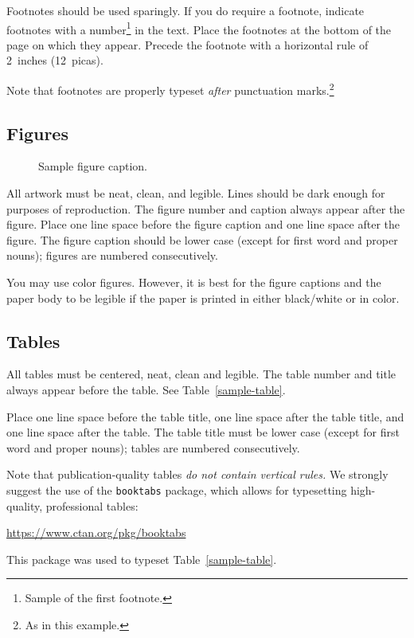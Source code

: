 \documentclass{article}
\begin{document}
\begin{CJK}{UTF8}{gbsn}
Footnotes should be used sparingly.  If you do require a footnote, indicate
footnotes with a number\footnote{Sample of the first footnote.} in the
text. Place the footnotes at the bottom of the page on which they appear.
Precede the footnote with a horizontal rule of 2~inches (12~picas).


Note that footnotes are properly typeset \emph{after} punctuation
marks.\footnote{As in this example.}


\subsection{Figures}


\begin{figure}
  \centering
  \fbox{\rule[-.5cm]{0cm}{4cm} \rule[-.5cm]{4cm}{0cm}}
  \caption{Sample figure caption.}
\end{figure}


All artwork must be neat, clean, and legible. Lines should be dark enough for
purposes of reproduction. The figure number and caption always appear after the
figure. Place one line space before the figure caption and one line space after
the figure. The figure caption should be lower case (except for first word and
proper nouns); figures are numbered consecutively.


You may use color figures.  However, it is best for the figure captions and the
paper body to be legible if the paper is printed in either black/white or in
color.


\subsection{Tables}


All tables must be centered, neat, clean and legible.  The table number and
title always appear before the table.  See Table~\ref{sample-table}.


Place one line space before the table title, one line space after the
table title, and one line space after the table. The table title must
be lower case (except for first word and proper nouns); tables are
numbered consecutively.


Note that publication-quality tables \emph{do not contain vertical rules.} We
strongly suggest the use of the \verb+booktabs+ package, which allows for
typesetting high-quality, professional tables:
\begin{center}
  \url{https://www.ctan.org/pkg/booktabs}
\end{center}
This package was used to typeset Table~\ref{sample-table}.



\end{CJK}
\end{document}
